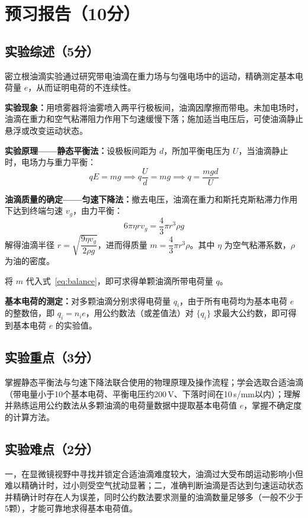 \documentclass{Preport}
\begin{document}
\setcounter{page}{1}
\makecover

\section{预习报告（10分）}
\subsection{实验综述（5分）}

密立根油滴实验通过研究带电油滴在重力场与匀强电场中的运动，精确测定基本电荷量 $e$，从而证明电荷的不连续性。

\textbf{实验现象：}用喷雾器将油雾喷入两平行极板间，油滴因摩擦而带电。未加电场时，油滴在重力和空气粘滞阻力作用下匀速缓慢下落；施加适当电压后，可使油滴静止悬浮或改变运动状态。

\textbf{实验原理——静态平衡法：}设极板间距为 $d$，所加平衡电压为 $U$，当油滴静止时，电场力与重力平衡：
\begin{equation}
    qE = mg \implies q\frac{U}{d} = mg \implies q = \frac{mgd}{U}
    \label{eq:balance}
\end{equation}

\textbf{油滴质量的确定——匀速下降法：}撤去电压，油滴在重力和斯托克斯粘滞力作用下达到终端匀速 $v_g$，由力平衡：
\begin{equation}
    6\pi\eta r v_g = \frac{4}{3}\pi r^3 \rho g
    \label{eq:stokes}
\end{equation}
解得油滴半径 $r = \sqrt{\dfrac{9\eta v_g}{2\rho g}}$，进而得质量 $m = \dfrac{4}{3}\pi r^3 \rho$。其中 $\eta$ 为空气粘滞系数，$\rho$ 为油的密度。

将 $m$ 代入式~\eqref{eq:balance}，即可求得单颗油滴所带电荷量 $q$。

\textbf{基本电荷的测定：}对多颗油滴分别求得电荷量 $q_i$，由于所有电荷均为基本电荷 $e$ 的整数倍，即 $q_i = n_i e$，用公约数法（或差值法）对 $\{q_i\}$ 求最大公约数，即可得到基本电荷 $e$ 的实验值。

\subsection{实验重点（3分）}

掌握静态平衡法与匀速下降法联合使用的物理原理及操作流程；学会选取合适油滴（带电量小于10个基本电荷、平衡电压约200\,V、下落时间在10\,s/mm以内）；理解并熟练运用公约数法从多颗油滴的电荷量数据中提取基本电荷值 $e$，掌握不确定度的计算方法。

\subsection{实验难点（2分）}

一，在显微镜视野中寻找并锁定合适油滴难度较大，油滴过大受布朗运动影响小但难以精确计时，过小则受空气扰动显著；二，准确判断油滴是否达到匀速运动状态并精确计时存在人为误差，同时公约数法要求测量的油滴数量足够多（一般不少于5颗），才能可靠地求得基本电荷值。


\end{document}
